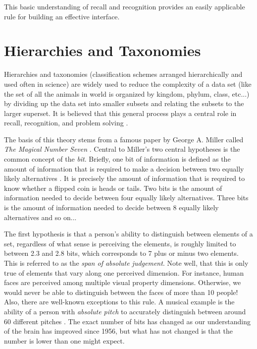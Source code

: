 This basic understanding of recall and recognition provides an easily applicable rule for building an effective interface.

\section{Hierarchies and Taxonomies}

\begin{comment}
Papers:
Magic number seven, George Miller
recoding pg. 93
increasing bits per chunk
The Structure of the Information Visualization Design Space, Section 2
enclosure
Coding Recoding Hierarchical Information
Acquisiton and forgetting of hierarchically organized information
\end{comment}

Hierarchies and taxonomies (classification schemes arranged hierarchically and used often in science) are widely used to reduce the complexity of a data set (like the set of all the animals in world is organized by kingdom, phylum, class, etc...) by dividing up the data set into smaller subsets and relating the subsets to the larger superset. It is believed that this general process plays a central role in recall, recognition, and problem solving \cite{seven1956}\cite{graphicalhierarchy1972}\cite{hierarchical1971}. 

The basis of this theory stems from a famous paper by George A. Miller called \emph{The Magical Number Seven} \cite{seven1956}. Central to Miller's two central hypotheses is the common concept of the \emph{bit}. Briefly, one bit of information is defined as the amount of information that is required to make a decision between two equally likely alternatives \cite{seven1956}. It is precisely the amount of information that is required to know whether a flipped coin is heads or tails. Two bits is the amount of information needed to decide between four equally likely alternatives. Three bits is the amount of information needed to decide between 8 equally likely alternatives and so on...

The first hypothesis is that a person's ability to distinguish between elements of a set, regardless of what sense is perceiving the elements, is roughly limited to between 2.3 and 2.8 bits, which corresponds to 7 plus or minus two elements. This is referred to as the \emph{span of absolute judgement}. Note well, that this is only true of elements that vary along one perceived dimension. For instance, human faces are perceived among multiple visual property dimensions. Otherwise, we would never be able to distinguish between the faces of more than 10 people! Also, there are well-known exceptions to this rule. A musical example is the ability of a person with \emph{absolute pitch} to accurately distinguish between around 60 different pitches \cite{seven1956}. The exact number of bits has changed as our understanding of the brain has improved since 1956, but what has not changed is that the number is lower than one might expect. 

